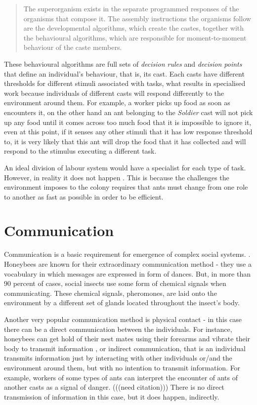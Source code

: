 \begin{quotation}The superorganism exists in the separate programmed responses of the organisms that compose it. The assembly instructions the organisms follow are the developmental algorithms, which create the castes, together with the behavioural algorithms, which are responsible for moment-to-moment behaviour of the caste members.
\end{quotation}


These behavioural algorithms are full sets of \emph{decision rules} and \emph{decision points} that define an individual's behaviour, that is, its cast. Each casts have different thresholds for different stimuli associated with tasks, what results in specialised work because individuals of different casts will respond differently to the environment around them. For example, a worker picks up food as soon as encounters it, on the other hand an ant belonging to the \emph{Soldier} cast will not pick up any food until it comes across too much food that it is impossible to ignore it, even at this point, if it senses any other stimuli that it has low response threshold to, it is very likely that this ant will drop the food that it has collected and will respond to the stimulus executing a different task.

An ideal division of labour system would have a specialist for each type of task. However, in reality it does not happen \cite{wilson1968} \cite{oster1979caste}. This is because the challenges the environment imposes to the colony requires that ants must change from one role to another as fast as possible in order to be efficient.

\section {Communication}
\label{sec:ant-comm}

Communication is a basic requirement for emergence of complex social systems. \cite{seeley1995wisdom}. Honeybees are known for their extraordinary communication method - they use a vocabulary in which messages are expressed in form of dances. \cite{Bienentanz} But, in more than 90 percent of cases, social insects use some form of chemical signals when communicating. \cite{citeulike:3731267} These chemical signals, pheromones, are laid onto the environment by a different set of glands located throughout the insect's body. 

Another very popular communication method is physical contact - in this case there can be a direct communication between the individuals. For instance, honeybees can get hold of their nest mates using their forearms and vibrate their body to transmit information \cite{allen1959}, or indirect communication, that is an individual transmits information just by interacting with other individuals or/and the environment around them, but with no intention to transmit information. For example, workers of some types of ants can interpret the encounter of ants of another casts as a signal of danger. (((need citation))) There is no direct transmission of information in this case, but it does happen, indirectly.

